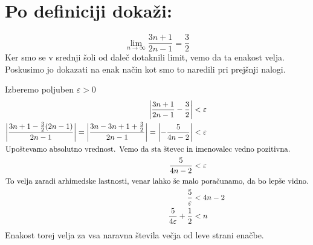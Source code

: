 \documentclass[a4paper, 12pt]{article}
\begin{document}
    \section{Po definiciji dokaži:}
    \[
    \lim_{n \to \infty} \frac{3n + 1} {2n-1} = \frac{3}{2}
    \]
    Ker smo se v srednji šoli od daleč dotaknili limit, vemo da ta enakost velja. Poskusimo jo dokazati na enak način kot smo to naredili pri prejšnji nalogi.
    
    Izberemo poljuben $\varepsilon > 0$
    \begin{align*}
        \left|  \frac{3n + 1} {2n-1} - \frac{3}{2} \right| &< \varepsilon \\
        \left|  \frac{3n + 1- \frac{3}{2}(2n-1)} {2n-1}\right| = 
        \left|  \frac{3n - 3n + 1 + \frac{3}{2}} {2n-1} \right| = 
        \left| - \frac{5} {4n-2} \right| &< \varepsilon \\
        \intertext{Upoštevamo absolutno vrednost. Vemo da sta števec in imenovalec vedno pozitivna.}
        \frac{5} {4n-2} &< \varepsilon \\
        \intertext{To velja zaradi arhimedske lastnosti, venar lahko še malo poračunamo, da bo lepše vidno.}
        \frac{5} {\varepsilon} &< 4n - 2 \\
        \frac{5} {4\varepsilon} + \frac{1}{2} &< n
    \end{align*}
    Enakost torej velja za vsa naravna števila večja od leve strani enačbe.
    
\end{document}
